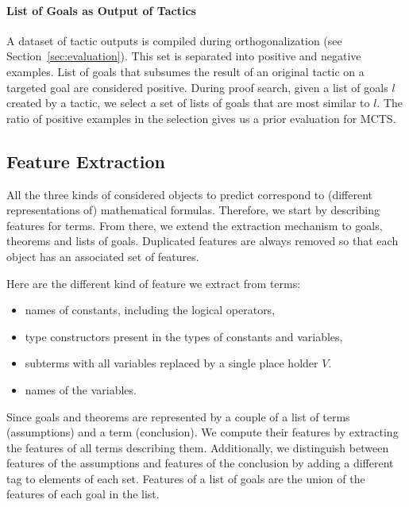 \documentclass[runningheads,a4paper,draft]{svjour3}
\begin{document}
\paragraph{List of Goals as Output of Tactics}
A dataset of tactic outputs is compiled during orthogonalization (see
Section~\ref{sec:evaluation}).
This set is separated into positive and negative examples.
List of goals that subsumes the result of an original tactic on a
targeted goal are considered positive. During proof search, given a list of
goals $l$ created by a tactic, we select a set of lists of goals that are most
similar to $l$. The ratio of positive examples in the selection gives us a
prior evaluation for MCTS.


\subsection{Feature Extraction}\label{sec:features}
All the three kinds of considered objects to predict correspond to (different representations of)
mathematical
formulas. Therefore, we start by describing features for terms. From there, we
extend the extraction mechanism
to goals, theorems and lists of goals. Duplicated features are always removed
so that each object has an associated set of features.


Here are the different kind of feature we extract from terms:
\begin{itemize}
\item names of constants, including the logical operators,
\item type constructors present in the types of constants and variables,
\item subterms with all variables replaced by a single place holder $V$.
\item names of the variables.
\end{itemize}

Since goals and theorems are represented by a couple of a list of terms
(assumptions) and a term (conclusion). We compute their features by extracting
the features of all terms describing them. Additionally, we distinguish between
features of the assumptions and features of the conclusion by adding a
different tag to elements of each set. Features of a list of goals are
the union of the features of each goal in the list.
\end{document}
